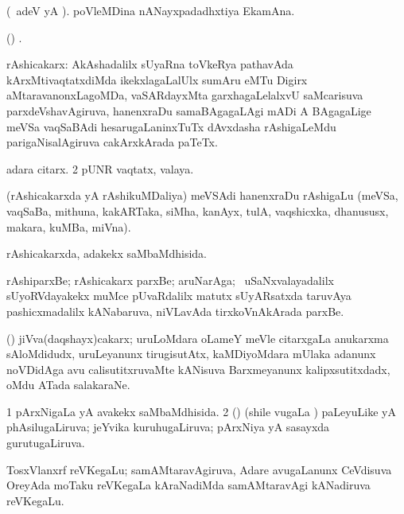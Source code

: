 \bentry
{} 
\gl{\nA} 
\bmng
(\bava\ adeV yA ).
poVleMDina nANayxpadadhxtiya EkamAna. 
\emng 
\eentry

\bentry
{}
\gl{\saMkeV} 
\bmng
(\ravi) .
\emng
\eentry

\bentry
{} 
\gl{\nA}
\bmng
\bnum
{} rAshicakarx:
\banum
{} AkAshadalilx sUyaRna toVkeRya pathavAda kArxMtivaqtatxdiMda ikekxlagaLalUlx sumAru eMTu Digirx aMtaravanonxLagoMDa, vaSARdayxMta garxhagaLelalxvU saMcarisuva parxdeVshavAgiruva, hanenxraDu samaBAgagaLAgi mADi A BAgagaLige meVSa vaqSaBAdi hesarugaLaninxTuTx dAvxdasha rAshigaLeMdu parigaNisalAgiruva cakArxkArada paTeTx.  

  adara citarx.  
\eanum
\numie
\num{2}  pUNR vaqtatx, valaya.
\enum
\emng

\noindent
\gl{\pagu} 
\bmng
{} (rAshicakarxda yA rAshikuMDaliya) meVSAdi hanenxraDu rAshigaLu (meVSa, vaqSaBa, mithuna, kakARTaka, siMha, kanAyx, tulA, vaqshicxka, dhanususx, makara, kuMBa, miVna). \quad {}
\emng
\eentry

\bentry
{} 
\gl{\gu} 
\bmng
rAshicakarxda, adakekx saMbaMdhisida.
\emng
\eentry

\bentry
{} 
\gl{\nA} 
\bmng
rAshiparxBe; rAshicakarx parxBe; aruNarAga; \kanmu\ uSaNxvalayadalilx sUyoRVdayakekx muMce pUvaRdalilx matutx sUyARsatxda taruvAya pashicxmadalilx kANabaruva, niVLavAda tirxkoVnAkArada parxBe.
\emng
\eentry

\bentry
{} 
\gl{\nA}  
\bmng
(\ca) jiVva(daqshayx)cakarx; uruLoMdara oLameY meVle citarxgaLa anukarxma sAloMdidudx, uruLeyanunx tirugisutAtx, kaMDiyoMdara mUlaka adanunx noVDidAga avu calisutitxruvaMte kANisuva Barxmeyanunx kalipxsutitxdadx, oMdu ATada salakaraNe.
\emng
\eentry

\bentry
{} 
\gl{\gu} 
\bmng
\bnum
\num{1} pArxNigaLa yA avakekx saMbaMdhisida. 
\num{2} (\BUvi) (shile \mo vugaLa \vi) paLeyuLike yA phAsilugaLiruva; jeYvika kuruhugaLiruva; pArxNiya yA sasayxda gurutugaLiruva.
\enum
\emng
\eentry

\bentry
{} 
\gl{\nA}
\bmng
TosxVlanxrf reVKegaLu; samAMtaravAgiruva, Adare avugaLanunx  CeVdisuva OreyAda moTaku reVKegaLa kAraNadiMda  samAMtaravAgi kANadiruva  reVKegaLu. \quad {}
\emng
\eentry

